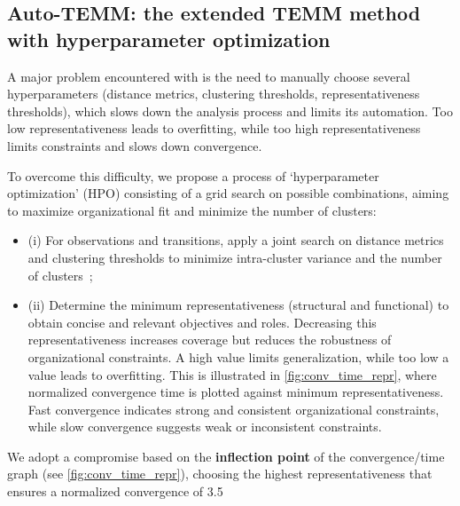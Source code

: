 \subsection{Auto-TEMM: the extended TEMM method with hyperparameter optimization}

A major problem encountered with  is the need to manually choose several hyperparameters (distance metrics, clustering thresholds, representativeness thresholds), which slows down the analysis process and limits its automation. Too low representativeness leads to overfitting, while too high representativeness limits constraints and slows down convergence.


To overcome this difficulty, we propose a process of ‘hyperparameter optimization’ (HPO) consisting of a grid search on possible combinations, aiming to maximize organizational fit and minimize the number of clusters:

\begin {itemize}
\item (i) For observations and transitions, apply a joint search on distance metrics and clustering thresholds to minimize intra-cluster variance and the number of clusters~;
\item (ii) Determine the minimum representativeness (structural and functional) to obtain concise and relevant objectives and roles. Decreasing this representativeness increases coverage but reduces the robustness of organizational constraints. A high value limits generalization, while too low a value leads to overfitting. This is illustrated in \autoref{fig:conv_time_repr}, where normalized convergence time is plotted against minimum representativeness. Fast convergence indicates strong and consistent organizational constraints, while slow convergence suggests weak or inconsistent constraints.
\end{itemize}

We adopt a compromise based on the \textbf{inflection point} of the convergence/time graph (see \autoref{fig:conv_time_repr}), choosing the highest representativeness that ensures a normalized convergence of 3.5%

